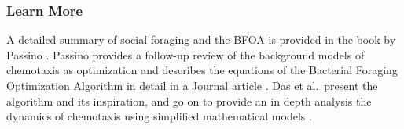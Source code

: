 % 
% 
\subsubsection{Learn More}
A detailed summary of social foraging and the BFOA is provided in the book by Passino \cite{Passino2005}.
Passino provides a follow-up review of the background models of chemotaxis as optimization and describes the equations of the  Bacterial Foraging Optimization Algorithm in detail in a Journal article \cite{Passino2010}.
Das et al.\ present the algorithm and its inspiration, and go on to provide an in depth analysis the dynamics of chemotaxis using simplified mathematical models \cite{Das2009}.


